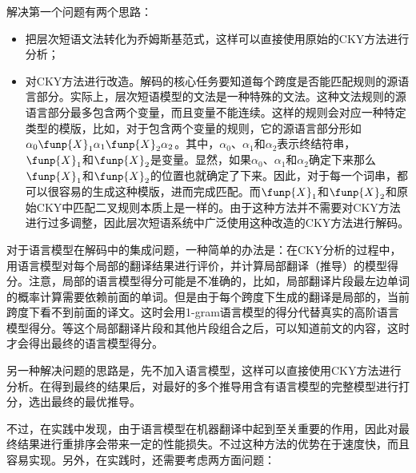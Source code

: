 \parinterval 解决第一个问题有两个思路：

\begin{itemize}
\vspace{0.5em}
\item 把层次短语文法转化为乔姆斯基范式，这样可以直接使用原始的CKY方法进行分析；
\vspace{0.5em}
\item 对CKY方法进行改造。解码的核心任务要知道每个跨度是否能匹配规则的源语言部分。实际上，层次短语模型的文法是一种特殊的文法。这种文法规则的源语言部分最多包含两个变量，而且变量不能连续。这样的规则会对应一种特定类型的模版，比如，对于包含两个变量的规则，它的源语言部分形如$\alpha_0 \funp{X}_1 \alpha_1 \funp{X}_2 \alpha_2$。其中，$\alpha_0$、$\alpha_1$和$\alpha_2$表示终结符串，$\funp{X}_1$和$\funp{X}_2$是变量。显然，如果$\alpha_0$、$\alpha_1$和$\alpha_2$确定下来那么$\funp{X}_1$和$\funp{X}_2$的位置也就确定了下来。因此，对于每一个词串，都可以很容易的生成这种模版，进而完成匹配。而$\funp{X}_1$和$\funp{X}_2$和原始CKY中匹配二叉规则本质上是一样的。由于这种方法并不需要对CKY方法进行过多调整，因此层次短语系统中广泛使用这种改造的CKY方法进行解码。
\vspace{0.5em}
\end{itemize}

\parinterval 对于语言模型在解码中的集成问题，一种简单的办法是：在CKY分析的过程中，用语言模型对每个局部的翻译结果进行评价，并计算局部翻译（推导）的模型得分。注意，局部的语言模型得分可能是不准确的，比如，局部翻译片段最左边单词的概率计算需要依赖前面的单词。但是由于每个跨度下生成的翻译是局部的，当前跨度下看不到前面的译文。这时会用1-gram语言模型的得分代替真实的高阶语言模型得分。等这个局部翻译片段和其他片段组合之后，可以知道前文的内容，这时才会得出最终的语言模型得分。

\parinterval 另一种解决问题的思路是，先不加入语言模型，这样可以直接使用CKY方法进行分析。在得到最终的结果后，对最好的多个推导用含有语言模型的完整模型进行打分，选出最终的最优推导。

\parinterval 不过，在实践中发现，由于语言模型在机器翻译中起到至关重要的作用，因此对最终结果进行重排序会带来一定的性能损失。不过这种方法的优势在于速度快，而且容易实现。另外，在实践时，还需要考虑两方面问题：

